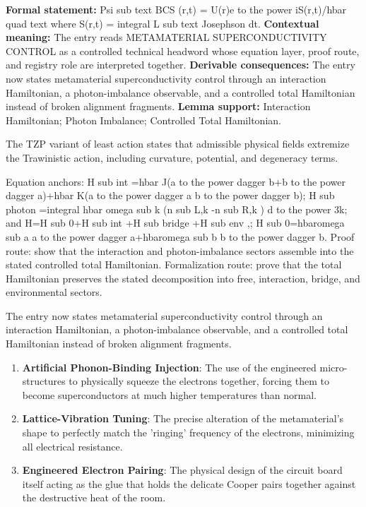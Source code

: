 \begingroup\footnotesize\setlength{\emergencystretch}{3em}\sloppy
\textbf{Formal statement:} Psi sub text BCS (r,t) = U(r)e to the power iS(r,t)/hbar quad text where S(r,t) = integral L sub text Josephson dt. \textbf{Contextual meaning:} The entry reads METAMATERIAL SUPERCONDUCTIVITY CONTROL as a controlled technical headword whose equation layer, proof route, and registry role are interpreted together. \textbf{Derivable consequences:} The entry now states metamaterial superconductivity control through an interaction Hamiltonian, a photon-imbalance observable, and a controlled total Hamiltonian instead of broken alignment fragments. \textbf{Lemma support:} Interaction Hamiltonian; Photon Imbalance; Controlled Total Hamiltonian.\par
\endgroup

The TZP variant of least action states that admissible physical fields extremize the Trawinistic action, including curvature, potential, and degeneracy terms.

Equation anchors: H sub int =hbar J(a to the power dagger b+b to the power dagger a)+hbar K(a to the power dagger a b to the power dagger b); H sub photon =integral hbar omega sub k (n sub L,k -n sub R,k ) d to the power 3k; and H=H sub 0+H sub int +H sub bridge +H sub env ,; H sub 0=hbaromega sub a a to the power dagger a+hbaromega sub b b to the power dagger b. Proof route: show that the interaction and photon-imbalance sectors assemble into the stated controlled total Hamiltonian. Formalization route: prove that the total Hamiltonian preserves the stated decomposition into free, interaction, bridge, and environmental sectors.

The entry now states metamaterial superconductivity control through an interaction Hamiltonian, a photon-imbalance observable, and a controlled total Hamiltonian instead of broken alignment fragments.
\endgroup

\begin{enumerate}[leftmargin=1.6em,itemsep=6pt,topsep=4pt]
\item \textbf{Artificial Phonon-Binding Injection}: The use of the engineered micro-structures to physically squeeze the electrons together, forcing them to become superconductors at much higher temperatures than normal.
\item \textbf{Lattice-Vibration Tuning}: The precise alteration of the metamaterial's shape to perfectly match the 'ringing' frequency of the electrons, minimizing all electrical resistance.
\item \textbf{Engineered Electron Pairing}: The physical design of the circuit board itself acting as the glue that holds the delicate Cooper pairs together against the destructive heat of the room.
\end{enumerate}

